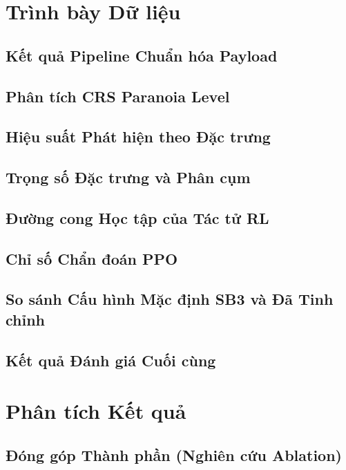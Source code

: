 \documentclass[12pt,a4paper,twoside]{report}
\begin{document}
\section{Trình bày Dữ liệu}

\subsection{Kết quả Pipeline Chuẩn hóa Payload}

\subsection{Phân tích CRS Paranoia Level}

\subsection{Hiệu suất Phát hiện theo Đặc trưng}

\subsection{Trọng số Đặc trưng và Phân cụm}

\subsection{Đường cong Học tập của Tác tử RL}

\subsection{Chỉ số Chẩn đoán PPO}

\label{fig:learning_curves}
\subsection{So sánh Cấu hình Mặc định SB3 và Đã Tinh chỉnh}

\subsection{Kết quả Đánh giá Cuối cùng}

\section{Phân tích Kết quả}

\subsection{Đóng góp Thành phần (Nghiên cứu Ablation)}
\end{document}
